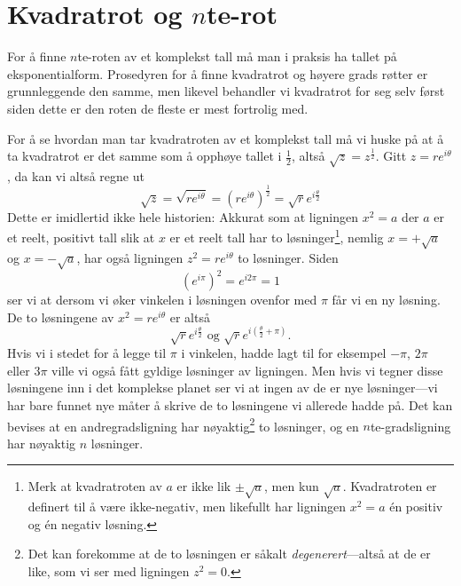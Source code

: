 \documentclass[a4paper,norsk,12pt]{article}
\begin{document}
\section{Kvadratrot og $n$te-rot}
For å finne $n$te-roten av et komplekst tall må man i praksis ha tallet på eksponentialform. Prosedyren for å finne kvadratrot og høyere grads røtter er grunnleggende den samme, men likevel behandler vi kvadratrot for seg selv først siden dette er den roten de fleste er mest fortrolig med.

For å se hvordan man tar kvadratroten av et komplekst tall må vi huske på at å ta kvadratrot er det samme som å opphøye tallet i $\frac12$, altså $\sqrt{z} = z^\frac12$. Gitt $z = re^{i\theta}$, da kan vi altså regne ut
\begin{displaymath}
	\sqrt{z} = \sqrt{re^{i\theta}} = \left(re^{i\theta}\right)^\frac12 = \sqrt{r}e^{i\frac{\theta}{2}}
\end{displaymath}
Dette er imidlertid ikke hele historien: Akkurat som at ligningen $x^2=a$ der $a$ er et reelt, positivt tall slik at $x$ er et reelt tall har to løsninger\footnote{Merk at kvadratroten av $a$ er ikke lik $\pm\sqrt{a}$, men kun $\sqrt{a}$. Kvadratroten er definert til å være ikke-negativ, men likefullt har ligningen $x^2=a$ \'en positiv og \'en negativ løsning.}, nemlig $x=+\sqrt{a}$ og $x =-\sqrt{a}$, har også ligningen $z^2=re^{i\theta}$ to løsninger. Siden
\begin{displaymath}
	(e^{i\pi})^2 = e^{i2\pi} = 1
\end{displaymath}
ser vi at dersom vi øker vinkelen i løsningen ovenfor med $\pi$ får vi en ny løsning. De to løsningene av $x^2 = re^{i\theta}$ er altså
\begin{displaymath}
	\sqrt{r}e^{i\frac{\theta}{2}} \text{ og } \sqrt{r}e^{i\left(\frac{\theta}{2} + \pi\right)}.
\end{displaymath}
Hvis vi i stedet for å legge til $\pi$ i vinkelen, hadde lagt til for eksempel $-\pi$, $2\pi$ eller $3\pi$ ville vi også fått gyldige løsninger av ligningen. Men hvis vi tegner disse løsningene inn i det komplekse planet ser vi at ingen av de er nye løsninger---vi har bare funnet nye måter å skrive de to løsningene vi allerede hadde på. Det kan bevises at en andregradsligning har nøyaktig\footnote{Det kan forekomme at de to løsningen er såkalt \emph{degenerert}---altså at de er like, som vi ser med ligningen $z^2=0$.} to løsninger, og en $n$te-gradsligning har nøyaktig $n$ løsninger.
\end{document}

